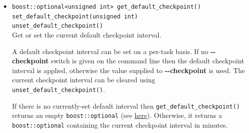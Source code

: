 \documentclass[11pt,a4paper]{article}
\newcommand{\packagefont}{\sffamily}
\newcommand{\CppTransport}{{\packagefont CppTransport}}
\newcommand{\SQLite}{{\packagefont SQLite}}
\newcommand{\option}[1]{{\ttfamily\bfseries\small #1}}
\begin{document}
\begin{itemize}
    To assist comparison of the results produced by {\CppTransport} with
    other methods of computing $n$-point functions,
    it is possible to have {\CppTransport} write extra
    table sinto the {\SQLite} container which gives the field-values
    at horizon exit for each configuration.
    For tasks computing the 2-point function only,
    {\CppTransport} will write a table called
    \texttt{horizon_exit_values}
    which
    fields values at horizon exit for the corresponding wavenumber.
    For tasks computing the 3-point function {\CppTransport}
    writes two tables:
    for each configuration,
    \texttt{horizon_exit_values}
    contains field values at horizon-exit for the
    wavenumber which exits
    earliest.
    In addition \texttt{kt_horizon_exit_values}
    contains the field values at horizon-exit for the
    average scale $k_t/3$.
    
    Note that these are \emph{not} the initial conditions used
    by {\CppTransport} internally.
    
    \item \texttt{boost::optional<unsigned int> get_default_checkpoint()} \\
    \texttt{set_default_checkpoint(unsigned int)} \\
    \texttt{unset_default_checkpoint()} \\
    Get or set the current default checkpoint interval.
    
    A default checkpoint interval can be set on a per-task basis.
    If no \option{{-}{-}checkpoint} switch is given on the command line then
    the default checkpoint interval is applied, otherwise the value
    supplied to \option{{-}{-}checkpoint} is used.
    The current checkpoint interval can be cleared
    using
    \texttt{unset_default_checkpoint()}.
    
    If there is no currently-set default interval then
    \texttt{get_default_checkpoint()} returns an empty
    \texttt{boost::optional}
    (see \href{http://www.boost.org/doc/libs/1_60_0/libs/optional/doc/html/index.html}{here}).
    Otherwise, it returns a
    \texttt{boost::optional} containing the current
    checkpoint interval in minutes.
    
\end{itemize}
\end{document}
